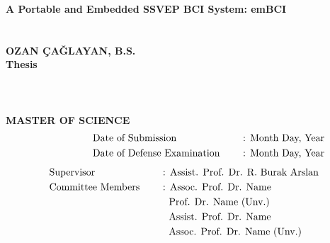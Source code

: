 \clearpage
\setcounter{page}{1}
\thispagestyle{empty}
{
\vspace*{-7.5mm}
\centering\textbf{A Portable and Embedded SSVEP BCI System: emBCI}\\\vspace*{1.5mm}
\\\vspace*{1.5mm}
\vspace*{13mm}
\\\vspace*{1.5mm}
\centering\textbf{OZAN ÇAĞLAYAN, B.S.}\\
\vspace*{30pt}
\centering\textbf{Thesis}\\\vspace*{1.5mm}
\\\vspace*{1.5mm}
\\\vspace*{1.5mm}
\\
\vspace*{30pt}
\centering\textbf{MASTER OF SCIENCE}\\
\vspace*{10pt}
\begin{alignat*}{2}
 & \quad\quad\quad\quad\quad\text{Date of Submission \quad } && \text{: Month Day, Year} \\
 & \quad\quad\quad\quad\quad\text{Date of Defense Examination \quad } && \text{: Month Day, Year}
\end{alignat*}
\vspace*{10pt}
\begin{alignat*}{2}
 & \text{Supervisor} && \text{: Assist. Prof. Dr. R. Burak Arslan} \\
 & \text{Committee Members \quad } && \text{: Assoc. Prof. Dr. Name} \\
 & \text{} && \text{\; Prof. Dr. Name (Unv.)} \\
 & \text{} && \text{\; Assist. Prof. Dr. Name} \\
 & \text{} && \text{\; Assoc. Prof. Dr. Name (Unv.)}
\end{alignat*}
}